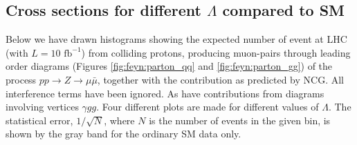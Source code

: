 \subsection{Cross sections for different $\Lambda$ compared to SM}
Below we have drawn histograms showing the expected number of event at LHC (with $L=10 \textrm{ fb}^{-1}$) from colliding protons, producing muon-pairs through leading order diagrams (Figures \ref{fig:feyn:parton_qq} and \ref{fig:feyn:parton_gg}) of the process $pp \rightarrow Z \rightarrow \mu \bar \mu$, together with the contribution as predicted by NCG. All interference terms have been ignored. As have contributions from diagrams involving vertices $\gamma gg$. Four different plots are made for different values of $\Lambda$. The statistical error, $1/\sqrt{N}$, where $N$ is the number of events in the given bin, is shown by the gray band for the ordinary SM data only.

